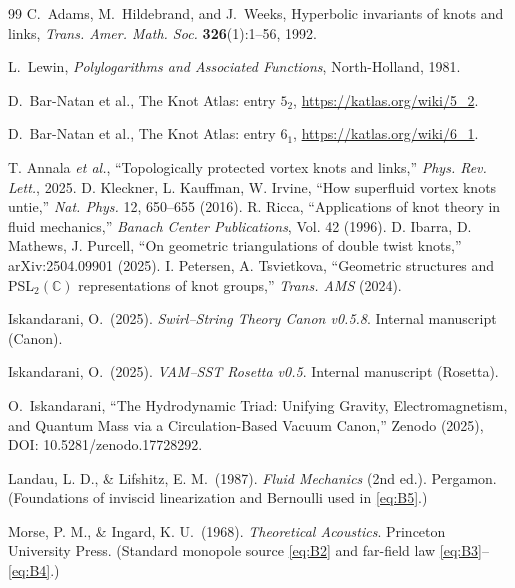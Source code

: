 \documentclass[10pt,reprint,aps,onecolumn,nofootinbib]{revtex4-2}
\begin{document}
\begin{thebibliography}{99}
    C.~Adams, M.~Hildebrand, and J.~Weeks,
    \newblock Hyperbolic invariants of knots and links,
    \newblock \emph{Trans. Amer. Math. Soc.} \textbf{326}(1):1--56, 1992.

    L.~Lewin,
    \newblock \emph{Polylogarithms and Associated Functions},
    \newblock North-Holland, 1981.

    D.~Bar-Natan et al.,
    \newblock The Knot Atlas: entry \(5_2\),
    \newblock \url{https://katlas.org/wiki/5_2}.

    D.~Bar-Natan et al.,
    \newblock The Knot Atlas: entry \(6_1\),
    \newblock \url{https://katlas.org/wiki/6_1}.

     T. Annala \emph{et al.}, ``Topologically protected vortex knots and links,'' \emph{Phys. Rev. Lett.}, 2025.
     D. Kleckner, L. Kauffman, W. Irvine, ``How superfluid vortex knots untie,'' \emph{Nat. Phys.} 12, 650–655 (2016).
     R. Ricca, ``Applications of knot theory in fluid mechanics,'' \emph{Banach Center Publications}, Vol. 42 (1996).
     D. Ibarra, D. Mathews, J. Purcell, ``On geometric triangulations of double twist knots,'' arXiv:2504.09901 (2025).
     I. Petersen, A. Tsvietkova, ``Geometric structures and PSL$_2(\mathbb{C})$ representations of knot groups,'' \emph{Trans. AMS} (2024).


    Iskandarani, O.\ (2025).
    \emph{Swirl–String Theory Canon v0.5.8}.
    Internal manuscript (Canon).

    Iskandarani, O.\ (2025).
    \emph{VAM–SST Rosetta v0.5}.
    Internal manuscript (Rosetta).

    O.~Iskandarani,
    ``The Hydrodynamic Triad: Unifying Gravity, Electromagnetism, and Quantum Mass
    via a Circulation-Based Vacuum Canon,''
    Zenodo (2025), DOI: 10.5281/zenodo.17728292.

    Landau, L. D., \& Lifshitz, E. M.\ (1987).
    \emph{Fluid Mechanics} (2nd ed.). Pergamon.
    (Foundations of inviscid linearization and Bernoulli used in \eqref{eq:B5}.)

    Morse, P. M., \& Ingard, K. U.\ (1968).
    \emph{Theoretical Acoustics}. Princeton University Press.
    (Standard monopole source \eqref{eq:B2} and far-field law \eqref{eq:B3}–\eqref{eq:B4}.)


\end{thebibliography}
\end{document}
